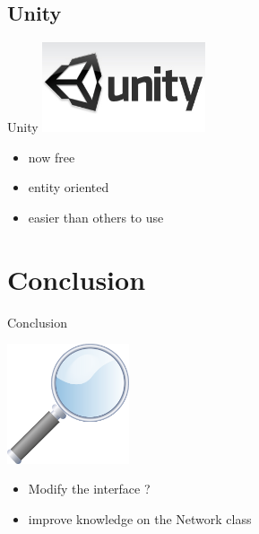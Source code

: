 \documentclass[a4paper,10pt]{beamer}
\begin{document}
		\subsection{Unity}
		
			\begin{frame}{Unity}
				\includegraphics[height=75pt]{images/logos/Logo_Unity.jpg}
				\begin{itemize}
					\item now free
					\item entity oriented
					\item easier than others to use
				\end{itemize}
			\end{frame}
			
		

	
	\section{Conclusion}
	
		\begin{frame}{Conclusion}
			\centerline{\includegraphics[height=100pt]{images/conclusion/loupe.png}}
			\begin{itemize}
				\item Modify the interface ?
				\item improve knowledge on the Network class
			\end{itemize}
		\end{frame}
\end{document}
